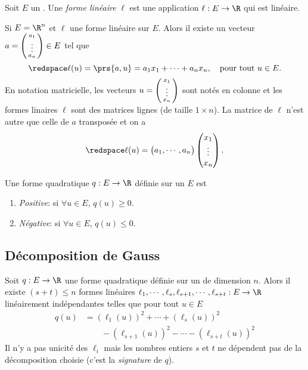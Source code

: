 \begin{definition}
	Soit $E$ un \rev. Une \emph{forme linéaire} $\ell$ est une application $\ell:E\to\R$ qui est linéaire.
\end{definition}
Si $E =\R^n$ et $\ell$ une forme linéaire sur $E$. Alors il existe un vecteur $a= \begin{psmallmatrix}
	a_1\\\vdots\\a_n
\end{psmallmatrix}\in E$ tel que
\[\redspace
	\ell(u) = \prs{a,u} = a_1 x_1 + \cdots + a_n x_n   , \quad \text{pour tout $u\in E$}.
\]
En notation matricielle, les vecteurs $u= \begin{psmallmatrix}
	x_1\\\vdots\\x_n
\end{psmallmatrix}$ sont notés en colonne et les formes linaires $\ell$ sont des matrices lignes (de taille $1\times n$). La matrice de $\ell$ n'est autre que celle de $a$ transposée et on a
\[\redspace
	\ell(u) = \begin{pmatrix}
		a_1, \cdots, a_n
	\end{pmatrix}\begin{pmatrix}
		x_1\\\vdots\\x_n
	\end{pmatrix}.
\]
\begin{definition}
	Une forme quadratique $q:E \to \R$ définie sur un \rev{} $E$ est
	\begin{enumerate}
		\item \emph{Positive}: si $\forall u\in E$, $q(u)\geq 0$.
		\item \emph{Négative}: si $\forall u\in E$, $q(u)\leq 0$.
	\end{enumerate}
\end{definition}


\sld{\vfill\pagebreak[5]}%
\subsection{Décomposition de Gauss}

Soit $q: E \to \R$ une forme quadratique définie sur un \rev{} de dimension $n$. Alors il existe $(s+t)\leq n$ formes linéaires $\ell_1,\cdots,\ell_s,\ell_{s+1},\cdots,\ell_{s+t}: E \to \R$ linéairement indépendantes telles que pour tout $u\in E$
\begin{align*}
	q(u) & = \left( \ell_1(u) \right)^2 + \cdots + \left( \ell_s(u) \right)^2 \\
	& \qquad- \left( \ell_{s+1}(u) \right)^2 - \cdots - \left( \ell_{s+t}(u) \right)^2
\end{align*}
Il n'y a pas unicité des $\ell_i$ mais les nombres entiers $s$ et $t$ ne dépendent pas de la décomposition choisie (c'est la \emph{signature} de $q$). 

